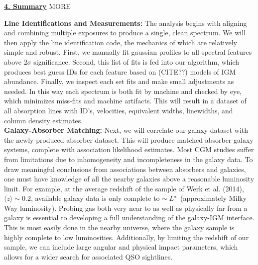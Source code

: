 \documentclass[12pt]{article}
\begin{document}
\noindent \underline{\textbf{4. Summary}}
MORE


%
%
\describearchival       %

\textbf{Line Identifications and Measurements:} The analysis begins with aligning and combining multiple exposures to produce a single, clean spectrum. We will then apply the line identification code, the mechanics of which are relatively simple and robust. First, we manually fit gaussian profiles to all spectral features above $2\sigma$ significance. Second, this list of fits is fed into our algorithm, which produces best guess IDs for each feature based on (CITE??) models of IGM abundance. Finally, we inspect each set fits and make small adjustments as needed. In this way each spectrum is both fit by machine and checked by eye, which minimizes miss-fits and machine artifacts. This will result in a dataset of all absorption lines with ID's, velocities, equivalent widths, linewidths, and column density estimates. \\


\noindent \textbf{Galaxy-Absorber Matching:} Next, we will correlate our galaxy dataset with the newly produced absorber dataset. This will produce matched absorber-galaxy systems, complete with association likelihood estimates. Most CGM studies suffer from limitations due to inhomogeneity and incompleteness in the galaxy data. To draw meaningful conclusions from associations between absorbers and galaxies, one must have knowledge of all the nearby galaxies above a reasonable luminosity limit. For example, at the average redshift of the sample of Werk et al. (2014), $\langle z \rangle \sim 0.2$, available galaxy data is only complete to $\sim L^{\**}$ (approximately Milky Way luminosity). Probing gas both very near to as well as physically far from a galaxy is essential to developing a full understanding of the galaxy-IGM interface. This is most easily done in the nearby universe, where the galaxy sample is highly complete to low luminosities. Additionally, by limiting the redshift of our sample, we can include large angular and physical impact parameters, which allows for a wider search for associated QSO sightlines.
\end{document}
